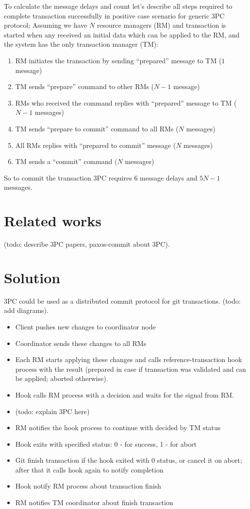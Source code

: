\documentclass[acmlarge, screen, nonacm]{acmart}
\begin{document}
To calculate the message delays and count let's describe all steps required to complete transaction successfully in
positive case scenario for generic 3PC protocol; Assuming we have $N$ resource managers (RM) and transaction is
started when any received an initial data which can be applied to the RM, and the system has the only transaction
manager (TM):
\begin{enumerate}
  \item RM initiates the transaction by sending ``prepared'' message to TM ($1$ message)
  \item TM sends ``prepare'' command to other RMs ($N-1$ message)
  \item RMs who received the command replies with ``prepared'' message to TM ($N-1$ messages)
  \item TM sends ``prepare to commit'' command to all RMs ($N$ messages)
  \item All RMs replies with ``prepared to commit'' message ($N$ messages)
  \item TM sends a ``commit'' command ($N$ messages)
\end{enumerate}

So to commit the transaction 3PC requires 6 message delays and $5N-1$ messages.

\section{Related works}

(todo: describe 3PC papers, paxos-commit about 3PC).

\section{Solution}

3PC could be used as a distributed commit protocol for git transactions. (todo: add diagrams).
\begin{itemize}
  \item Client pushes new changes to coordinator node
  \item Coordinator sends these changes to all RMs
  \item Each RM starts applying these changes and calls reference-transaction hook process with the result (prepared
    in case if transaction was validated and can be applied; aborted otherwise).
  \item Hook calls RM process with a decision and waits for the signal from RM.
  \item (todo: explain 3PC here)
  \item RM notifies the hook process to continue with decided by TM status
  \item Hook exits with specified status: 0 - for success, 1 - for abort
  \item Git finish transaction if the hook exited with 0 status, or cancel it on abort; after that it
    calls hook again to notify completion
  \item Hook notify RM process about transaction finish
  \item RM notifies TM coordinator about finish transaction
\end{itemize}
\end{document}
